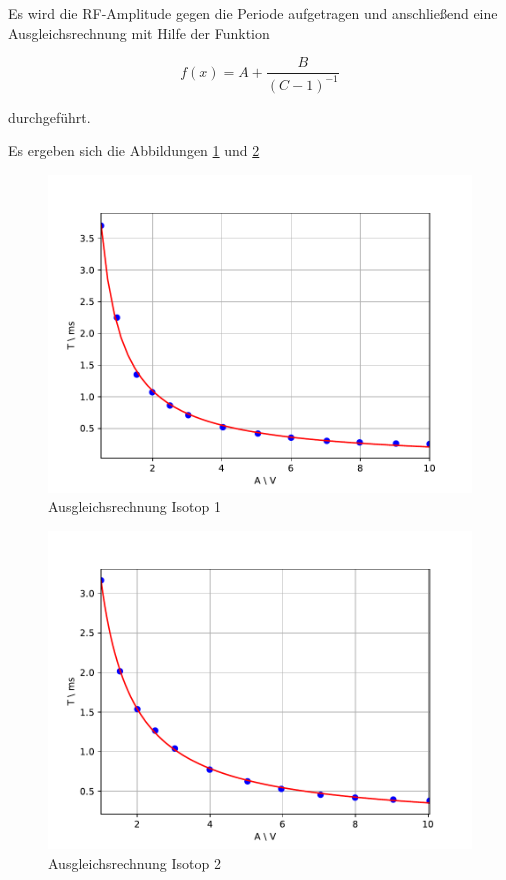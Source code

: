 Es wird die RF-Amplitude gegen die Periode aufgetragen und anschließend eine Ausgleichsrechnung mit Hilfe der Funktion

\begin{equation}
f(x) = A + \frac{B}{(C-1)^{-1}}
\end{equation}

durchgeführt.

Es ergeben sich die Abbildungen \ref{trans1} und \ref{trans2}

\begin{figure}[h]
\centering
\includegraphics[scale=0.8]{img/trans1.pdf}
\caption{Ausgleichsrechnung Isotop 1}
\label{trans1}
\end{figure}

\begin{figure}[h]
\centering
\includegraphics[scale=0.8]{img/trans2.pdf}
\caption{Ausgleichsrechnung Isotop 2}
\label{trans2}
\end{figure}

